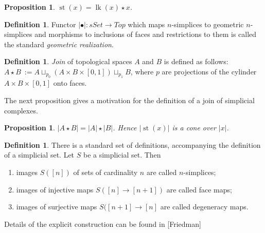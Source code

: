 \documentclass[english,12pt]{article}
\newcounter{stmcounter}[section]
\numberwithin{equation}{section}
\newtheorem{proposition}[stmcounter]{Proposition}
\theoremstyle{definition}
\newtheorem{definition}[stmcounter]{Definition}
\theoremstyle{remark}
\newcommand{\define}[1]{{\textit{#1}}}
\begin{document}
\begin{proposition}
  $\operatorname{st}(x) = \operatorname{lk}(x) \star x$.
\end{proposition}

\begin{definition}
  Functor $\left|\bullet\right| : sSet \to Top$ which maps $n$-simplices to geometric $n$-simplices and morphisms to inclusions of faces and restrictions to them is called the standard \define{geometric realization}.
\end{definition}

\begin{definition}
  \define{Join} of topological spaces $A$ and $B$ is defined as follows: $A \star B\ := A \sqcup_{p_0} (A \times B \times [0,1]) \sqcup_{p_1} B$, where $p$ are projections of the cylinder $A \times B \times [0,1]$ onto faces.
\end{definition}

The next proposition gives a motivation for the definition of a join of simplicial complexes.

\begin{proposition}
  $\left|A \star B\right| = \left|A\right| \star \left|B\right|$. Hence $\left|\operatorname{st}(x)\right|$ is a cone over $\left|x\right|$.
\end{proposition}

\begin{definition}
  There is a standard set of definitions, accompanying the definition of a simplicial set. Let $S$ be a simplicial set. Then
  \begin{enumerate}
    \item images $S([n])$ of sets of cardinality $n$ are called $n$-simplices;
    \item images of injective maps $S([n] \to [n+1])$ are called face maps;
    \item images of surjective maps $S([n+1] \to [n]$ are called degeneracy maps.
  \end{enumerate}
  
  Details of the explicit construction can be found in [Friedman]
\end{definition}
\end{document}
